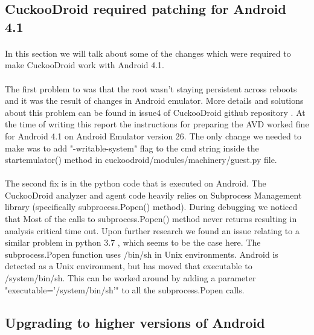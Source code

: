 \documentclass[../main.tex]{subfile}
\begin{document}
		\subsection{CuckooDroid required patching for Android 4.1}\label{sec:cuckoodroid_patching}
		\paragraph{} In this section we will talk about some of the changes which were required to make CuckooDroid work with Android 4.1.
		\paragraph{} The first problem to was that the root wasn't staying persistent across reboots and it was the result of changes in Android emulator. More details and solutions about this problem can be found in issue4 of CuckooDroid github repository \cite{cuckoodroid_root_issue}. At the time of writing this report the instructions for preparing the AVD worked fine for Android 4.1 on Android Emulator version 26. The only change we needed to make was to add "-writable-system" flag to the cmd string inside the start\textunderscore emulator() method in cuckoodroid/modules/machinery/guest.py file.
		
		\paragraph{} The second fix is in the python code that is executed on Android. The CuckooDroid analyzer and agent code heavily relies on Subprocess Management library \cite{subprocess_management_library} (specifically subprocess.Popen() method). During debugging we noticed that Most of the calls to subprocess.Popen() method never returns resulting in analysis critical time out. Upon further research we found an issue relating to a similar problem in python 3.7 \cite{subprocess.popen_issue16255}, which seems to be the case here. The subprocess.Popen function uses /bin/sh in Unix environments. Android is detected as a Unix environment, but has moved that executable to /system/bin/sh. This can be worked around by adding a parameter "executable='/system/bin/sh'" to all the subprocess.Popen calls.

		\subsection{Upgrading to higher versions of Android}
\end{document}
